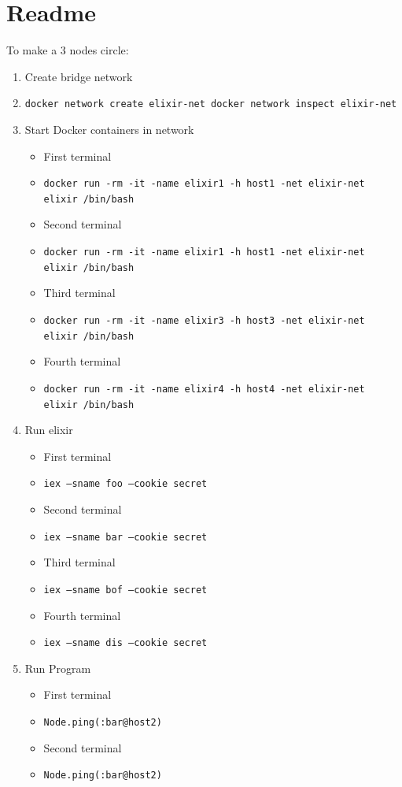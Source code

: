 \documentclass{article}
\begin{document}
 \section{Readme}
 To make a 3 nodes circle:
 \begin{enumerate}
  \item Create bridge network
  \item[] \texttt{docker network create elixir-net docker network inspect elixir-net }
  \item Start Docker containers in network
  \begin{itemize}
   \item First terminal
   \item[] \texttt{docker run -rm -it -name elixir1 -h host1 -net elixir-net elixir /bin/bash }
   \item Second terminal
   \item[] \texttt{docker run -rm -it -name elixir1 -h host1 -net elixir-net elixir /bin/bash}
   \item Third terminal
   \item[] \texttt{docker run -rm -it -name elixir3 -h host3 -net elixir-net elixir /bin/bash}
   \item Fourth terminal
   \item[] \texttt{docker run -rm -it -name elixir4 -h host4 -net elixir-net elixir /bin/bash}
  \end{itemize}
  \item Run elixir
  \begin{itemize}
   \item First terminal
   \item[] \texttt{iex --sname foo --cookie secret}
   \item Second terminal
   \item[] \texttt{iex --sname bar --cookie secret}
   \item Third terminal
   \item[] \texttt{iex --sname bof --cookie secret}
   \item Fourth terminal
   \item[] \texttt{iex --sname dis --cookie secret}
  \end{itemize}
  \item Run Program
  \begin{itemize}
   \item First terminal
   \item[] \texttt{Node.ping(:bar@host2)}
   \item Second terminal
   \item[] \texttt{Node.ping(:bar@host2)}

\end{itemize}
\end{enumerate}
\end{document}
